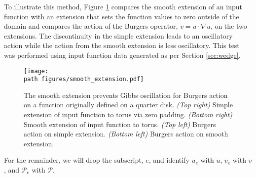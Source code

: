 To illustrate this method, Figure \ref{fig:smooth_extention} compares the smooth extension of an input function with an extension that sets the function values to zero outside of the domain and compares the action of the Burgers operator, $v = u\cdot \nabla u$, on the two extensions. The discontinuity in the simple extension leads to an oscillatory action while the action from the smooth extension is less oscillatory. This test was performed using input function data generated as per Section \ref{sec:wedge}.

\begin{figure}
    \centering
    \texttt{[image: \\path figures/smooth\_extension.pdf]}
    \caption{The smooth extension prevents Gibbs oscillation for Burgers action on a function originally defined on a quarter disk. \textit{(Top right)} Simple extension of input function to torus via zero padding. \textit{(Bottom right)} Smooth extension of input function to torus. \textit{(Top left)} Burgers action on simple extension. \textit{(Bottom left)} Burgers action on smooth extension.}
    \label{fig:smooth_extention}
\end{figure}


For the remainder, we will drop the subscript, $e$, and identify $u_e$ with $u$, $v_e$ with $v$, and $\mathcal{P}_e$ with $\mathcal{P}$.





